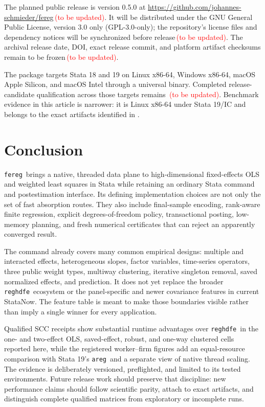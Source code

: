\documentclass[11pt]{article}
\newcommand{\fereg}{\texttt{fereg}}
\newcommand{\reghdfe}{\texttt{reghdfe}}
\newcommand{\areg}{\texttt{areg}}
\newcommand{\tbu}{\textcolor{red}{\,(\textup{to be updated})}}
\begin{document}
The planned public release is version 0.5.0 at
\url{https://github.com/johannes-schmieder/fereg}\tbu.  It will be distributed
under the GNU General Public License, version 3.0 only (GPL-3.0-only); the
repository's license files and dependency notices will be synchronized before
release\tbu.  The archival release date, DOI, exact release commit, and
platform artifact checksums remain to be frozen\tbu.

The package targets Stata 18 and 19 on Linux x86-64, Windows x86-64, macOS
Apple Silicon, and macOS Intel through a universal binary.  Completed
release-candidate qualification across those targets remains
\tbu.  Benchmark evidence in this article is narrower: it is Linux x86-64
under Stata 19/IC and belongs to the exact artifacts identified in
.

\section{Conclusion}
\label{sec:conclusion}

\fereg\ brings a native, threaded data plane to high-dimensional
fixed-effects OLS and weighted least squares in Stata while retaining an
ordinary Stata command and postestimation interface.  Its defining
implementation choices are not only the set of fast absorption routes.  They
also include final-sample encoding, rank-aware finite regression, explicit
degrees-of-freedom policy, transactional posting, low-memory planning, and
fresh numerical certificates that can reject an apparently converged result.

The command already covers many common empirical designs: multiple and
interacted effects, heterogeneous slopes, factor variables, time-series
operators, three public weight types, multiway clustering, iterative singleton
removal, saved normalized effects, and prediction.  It does not yet replace
the broader \reghdfe\ ecosystem or the panel-specific and newer covariance
features in current StataNow.  The feature table is meant to make those
boundaries visible rather than imply a single winner for every application.

Qualified SCC receipts show substantial runtime advantages over \reghdfe\ in
the one- and two-effect OLS, saved-effect, robust, and one-way clustered cells
reported here, while the registered worker--firm figures add an equal-resource
comparison with Stata 19's \areg\ and a separate view of native thread
scaling.  The evidence is deliberately versioned, preflighted, and limited to
its tested environments.  Future release work
should preserve that discipline: new performance claims should follow
scientific parity, attach to exact artifacts, and distinguish complete
qualified matrices from exploratory or incomplete runs.
\end{document}
